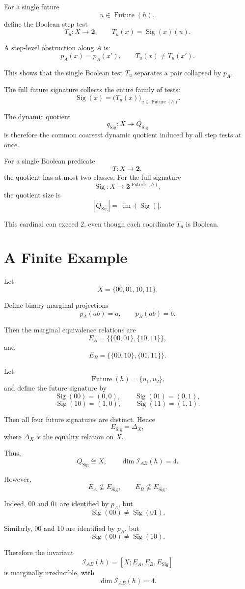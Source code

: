 \documentclass[11pt]{article}
\newcommand{\Future}{\operatorname{Future}}
\newcommand{\Sig}{\operatorname{Sig}}
\newcommand{\im}{\operatorname{im}}
\newcommand{\two}{\mathbf{2}}
\begin{document}
For a single future
\[
u\in\Future(h),
\]
define the Boolean step test
\[
T_u:X\to\two,
\qquad
T_u(x)=\Sig(x)(u).
\]

A step-level obstruction along \(A\) is:
\[
p_A(x)=p_A(x'),
\qquad
T_u(x)\neq T_u(x').
\]

This shows that the single Boolean test \(T_u\) separates a pair collapsed by \(p_A\).

The full future signature collects the entire family of tests:
\[
\Sig(x)=\bigl(T_u(x)\bigr)_{u\in\Future(h)}.
\]

The dynamic quotient
\[
q_\Sig:X\twoheadrightarrow Q_\Sig
\]
is therefore the common coarsest dynamic quotient induced by all step tests at once.

For a single Boolean predicate
\[
T:X\to\two,
\]
the quotient has at most two classes. For the full signature
\[
\Sig:X\to\two^{\Future(h)},
\]
the quotient size is
\[
|Q_\Sig|=|\im(\Sig)|.
\]

This cardinal can exceed \(2\), even though each coordinate \(T_u\) is Boolean.

\section{A Finite Example}

Let
\[
X=\{00,01,10,11\}.
\]

Define binary marginal projections
\[
p_A(ab)=a,
\qquad
p_B(ab)=b.
\]

Then the marginal equivalence relations are
\[
E_A=\bigl\{\{00,01\},\{10,11\}\bigr\},
\]
and
\[
E_B=\bigl\{\{00,10\},\{01,11\}\bigr\}.
\]

Let
\[
\Future(h)=\{u_1,u_2\},
\]
and define the future signature by
\[
\Sig(00)=(0,0),
\qquad
\Sig(01)=(0,1),
\]
\[
\Sig(10)=(1,0),
\qquad
\Sig(11)=(1,1).
\]

Then all four future signatures are distinct. Hence
\[
E_\Sig=\Delta_X,
\]
where \(\Delta_X\) is the equality relation on \(X\).

Thus,
\[
Q_\Sig\cong X,
\qquad
\dim\mathcal I_{AB}(h)=4.
\]

However,
\[
E_A\nsubseteq E_\Sig,
\qquad
E_B\nsubseteq E_\Sig.
\]

Indeed, \(00\) and \(01\) are identified by \(p_A\), but
\[
\Sig(00)\neq\Sig(01).
\]

Similarly, \(00\) and \(10\) are identified by \(p_B\), but
\[
\Sig(00)\neq\Sig(10).
\]

Therefore the invariant
\[
\mathcal I_{AB}(h)=[X;E_A,E_B,E_\Sig]
\]
is marginally irreducible, with
\[
\dim\mathcal I_{AB}(h)=4.
\]
\end{document}
